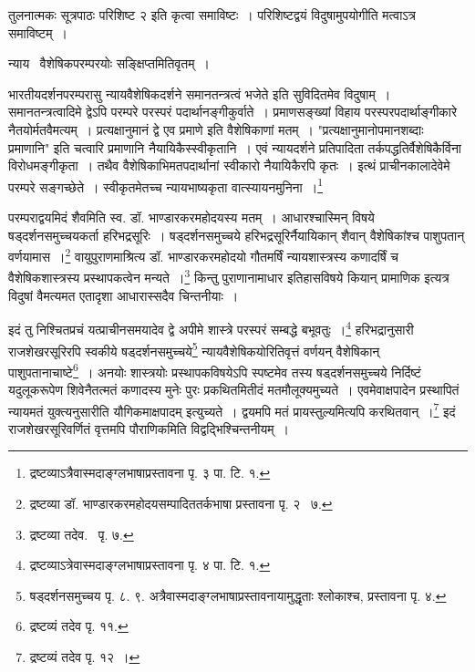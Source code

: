 \documentclass[11pt, openany]{book}
\begin{document}
\newpage
\noindent
तुलनात्मकः सूत्रपाठः परिशिष्ट २ इति कृत्वा समाविष्टः~। परिशिष्टद्वयं विदुषामुपयोगीति मत्वाऽत्र समाविष्टम्~।

\vspace{-3mm}
\begin{center}
{\knu न्याय \textendash\ वैशेषिकपरम्परयोः सङ्क्षिप्तमितिवृतम्~।}
\end{center}

भारतीयदर्शनपरम्परासु न्यायवैशेषिकदर्शने समानतन्त्रत्वं भजेते इति सुविदितमेव विदुषाम्~। समानतन्त्रत्वादिमे द्वेऽपि परम्परे परस्परं पदार्थानङ्गीकुर्वाते~। प्रमाणसङ्ख्यां विहाय परस्परपदार्थाङ्गीकारे नैतयोर्मतवैमत्यम्~। प्रत्यक्षानुमानं द्वे एव प्रमाणे इति वैशेषिकाणां मतम्~। "प्रत्यक्षानुमानोपमानशब्दाः प्रमाणानि" इति चत्वारि प्रमाणानि नैयायिकैस्स्वीकृतानि~। एवं न्यायदर्शने प्रतिपादिता तर्कपद्धतिर्वैशेषिकैर्विना विरोधमङ्गीकृता~। तथैव वैशेषिकाभिमतपदार्थानां स्वीकारो नैयायिकैरपि कृतः~। इत्थं प्राचीनकालादेवेमे परम्परे सङ्गच्छेते~। स्वीकृतमेतच्च न्यायभाष्यकृता वात्स्यायनमुनिना~।\renewcommand{\thefootnote}{२}\footnote{द्रष्टव्याऽत्रैवास्मदाङ्ग्लभाषाप्रस्तावना पृ. ३ पा. टि. १.}

परम्पराद्वयमिदं शैवमिति {\knu स्व. डॉ. भाण्डारकरमहोदयस्य} मतम्~। आधारश्चास्मिन् विषये {\knu षड्दर्शनसमुच्चय}कर्ता {\knu हरिभद्रसूरिः~। षड्दर्शनसमुच्चये हरिभद्रसूरि}र्नैयायिकान् शैवान् वैशेषिकांश्च पाशुपतान् वर्णयामास~।\renewcommand{\thefootnote}{३}\footnote{द्रष्टव्या डॉ. भाण्डारकरमहोदयसम्पादिततर्कभाषा प्रस्तावना पृ. २ \textendash\ ७.} वायुपुराणमाश्रित्य डॉ. भाण्डारकरमहोदयो {\knu गौतमर्षिं न्यायशा}स्त्रस्य कणादर्षिं च {\knu वैशेषिकशा}स्त्रस्य प्रस्थापकत्वेन मन्यते~।\renewcommand{\thefootnote}{४}\footnote{द्रष्टव्या तदेव. \textendash\ पृ. ७.} किन्तु पुराणानामाधार इतिहासविषये कियान् प्रामाणिक इत्यत्र विदुषां वैमत्यमत एतादृशा आधारास्सदैव चिन्तनीयाः~।

इदं तु निश्चितप्रचं यत्प्राचीनसमयादेव द्वे अपीमे शास्त्रे परस्परं सम्बद्धे बभूवतुः~।\renewcommand{\thefootnote}{५}\footnote{द्रष्टव्याऽत्रेवास्मदाङ्ग्लभाषाप्रस्तावना पृ. ४ पा. टि. १.} {\knu हरिभद्रानुसारी राजशेखर}सूरिरपि स्वकीये षड्दर्शनसमुच्चये\renewcommand{\thefootnote}{६}\footnote{षड्दर्शनसमुच्चय पृ. ८. ९. अत्रैवास्मदाङ्ग्लभाषाप्रस्तावनायामुद्धृताः श्लोकाश्च, प्रस्तावना पृ. ४.} न्यायवैशेषिकयोरितिवृत्तं वर्णयन् वैशेषिकान् पाशुपतानाचाष्टे\renewcommand{\thefootnote}{७}\footnote{द्रष्टव्यं तदेव पृ. ११.}~। अनयोः शास्त्रयोः प्रस्थापकविषयेऽपि स्पष्टमेव तस्य षड्दर्शनसमुच्चये निर्दिष्टं यदुलूकरूपेण शिवेनैतत्मतं कणादस्य मुनेः पुरः प्रकथितमितीदं मतमौलूक्यमुच्यते~। एवमेवाक्षपादेन प्रस्थापितं न्यायमतं युक्त्यनुसारीति {\knu यौगिकमाक्षपादम्} इत्युच्यते~। द्वयमपि मतं प्रायस्तुल्यमित्यपि करथितवान्~।\renewcommand{\thefootnote}{८}\footnote{द्रष्टव्यं तदेव पृ. १२~।} इदं राजशेखरसूरिवर्णितं वृत्तमपि पौराणिकमिति विद्वद्भिश्चिन्तनीयम्~।
\end{document}
